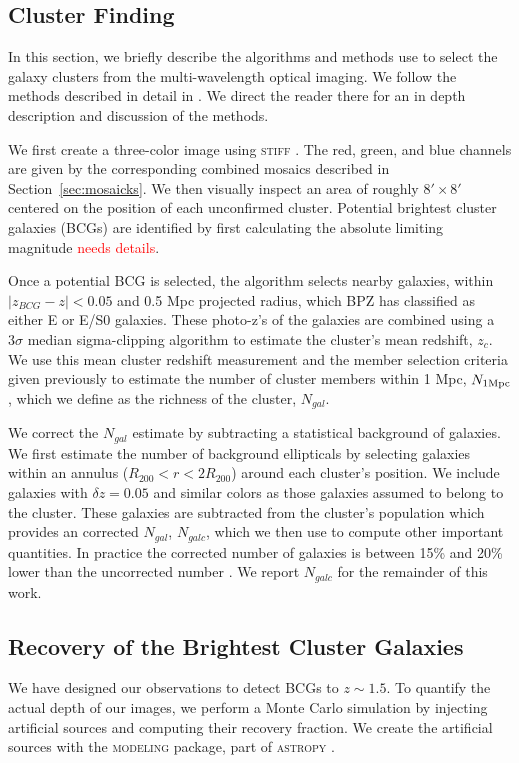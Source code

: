 \documentclass[apj, revtex4-1]{emulateapj}
\newcommand{\editorial}[1]{\textcolor{red}{#1}}
\begin{document}
\subsection{Cluster Finding}
In this section, we briefly describe the algorithms and methods use to select the galaxy clusters from the multi-wavelength optical imaging. We follow the methods described in detail in \cite{Menanteau2009a, Menanteau2010}. We direct the reader there for an in depth description and discussion of the methods.

We first create a three-color image using \textsc{stiff} \citep{Bertin2011}. The red, green, and blue channels are given by the corresponding combined mosaics described in Section~\ref{sec:mosaicks}. We then visually inspect an area of roughly $8' \times 8'$ centered on the position of each unconfirmed cluster. Potential brightest cluster galaxies (BCGs) are identified by first calculating the absolute limiting magnitude \editorial{needs details}.

Once a potential BCG is selected, the algorithm selects nearby galaxies, within $|z_{BCG} - z| < 0.05$ and 0.5 Mpc projected radius, which BPZ has classified as either E or E/S0 galaxies. These photo-z's of the galaxies are combined using a $3\sigma$ median sigma-clipping algorithm to estimate the cluster's mean redshift, $z_c$. We use this mean cluster redshift measurement and the member selection criteria given previously to estimate the number of cluster members within 1 Mpc, $N_{1\rm Mpc}$, which we define as the richness of the cluster, $N_{gal}$.

We correct the $N_{gal}$ estimate by subtracting a statistical background of galaxies. We first estimate the number of background ellipticals by selecting galaxies within an annulus ($R_{200} <r < 2R_{200}$) around each cluster's position. We include galaxies with $\delta z = 0.05$ and similar colors as those galaxies assumed to belong to the cluster. These galaxies are subtracted from the cluster's population which provides an corrected $N_{gal}$, $N_{galc}$, which we then use to compute other important quantities. In practice the corrected number of galaxies is between 15\% and 20\% lower than the uncorrected number \citep{Menanteau2010}. We report $N_{galc}$ for the remainder of this work.

\subsection{Recovery of the Brightest Cluster Galaxies}
We have designed our observations to detect BCGs to $z\sim1.5$. To quantify the actual depth of our images, we perform a Monte Carlo simulation by injecting artificial sources and computing their recovery fraction. We create the artificial sources with the \textsc{modeling} package, part of \textsc{astropy} \citep{TheAstropyCollaboration2013}.
\end{document}
